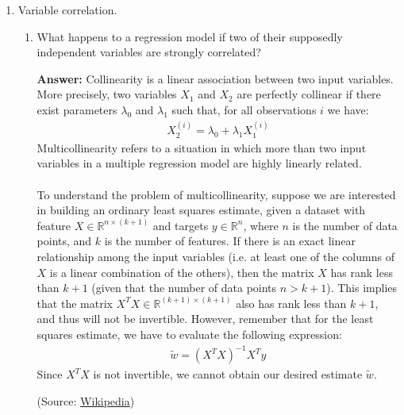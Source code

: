 \documentclass{article}
\newenvironment{QandA}{\begin{enumerate}[label=\arabic*.]}{\end{enumerate}}
\newenvironment{InnerQandA}{\begin{enumerate}[label=\roman*.]}{\end{enumerate}}
\newenvironment{answer}{\par\normalfont \textbf{Answer:}}{}
\newcommand{\R}{\mathbb{R}}
\begin{document}
\begin{QandA}
    \item Variable correlation.
    \begin{InnerQandA}
        \item What happens to a regression model if two of their supposedly independent variables are strongly correlated?
        \begin{answer}
            Collinearity is a linear association between two input variables. More precisely, two variables $X_1$ and $X_2$ are perfectly collinear if there exist parameters $\lambda_0$ and $\lambda_1$ such that, for all observations $i$ we have:
            \begin{align*}
                X_{2}^{(i)} = \lambda_0 + \lambda_1 X_{1}^{(i)}
            \end{align*}
            Multicollinearity refers to a situation in which more than two input variables in a multiple regression model are highly linearly related. \\\\
            To understand the problem of multicollinearity, suppose we are interested in building an ordinary least squares estimate, given a dataset with feature $X \in \R^{n \times (k+1)}$ and targets $y \in \R^{n}$, where $n$ is the number of data points, and $k$ is the number of features. If there is an exact linear relationship among the input variables (i.e. at least one of the columns of $X$ is a linear combination of the others), then the matrix $X$ has rank less than $k+1$ (given that the number of data points $n > k+1$). This implies that the matrix $X^T X \in \R^{(k+1) \times (k+1)}$ also has rank less than $k+1$, and thus will not be invertible. However, remember that for the least squares estimate, we have to evaluate the following expression:
            \begin{align*}
                \tilde{w} = (X^T X)^{-1} X^T y
            \end{align*}
            Since $X^T X$ is not invertible, we cannot obtain our desired estimate $\tilde{w}$. 
            
            (Source: \href{https://en.wikipedia.org/wiki/Multicollinearity}{Wikipedia})
        \end{answer}


\end{InnerQandA}
\end{QandA}
\end{document}

